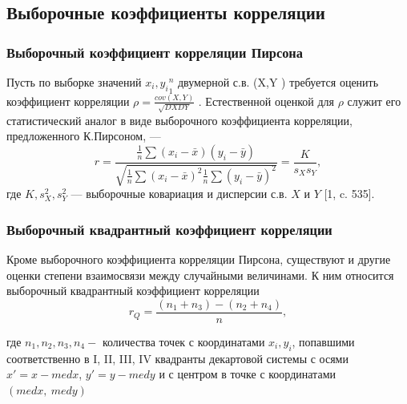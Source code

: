 \documentclass[a4paper,14pt]{article}
\begin{document}
	\subsection{Выборочные коэффициенты корреляции}
	\subsubsection{Выборочный коэффициент корреляции Пирсона}
	\noindent Пусть по выборке значений ${x_{i},y_{i}}^{n}_{1}$ двумерной с.в. (X,Y ) требуется оценить коэффициент корреляции $\rho = \frac{cov(X,Y)}{\sqrt{DXDY}}$ . Естественной оценкой для $\rho$ служит его статистический аналог в виде выборочного коэффициента корреляции, предложенного К.Пирсоном, —
	\begin{equation}
		r = \frac{
			\frac{1}{n}\sum{(x_{i} - \bar{x})(y_{i}-\bar{y})}
		}{
			\sqrt{\frac{1}{n}\sum{(x_{i} - \bar{x})^{2}}\frac{1}{n}\sum{(y_{i} - \bar{y})^{2}}}
		}=\frac{K}{s_{X}s_{Y}},
		\label{r}
	\end{equation}
	где $K,s^{2}_{X},s^{2}_{Y}$ — выборочные ковариация и дисперсии с.в. $X$ и $Y$ [1, c. 535].
	
	
	\subsubsection{Выборочный квадрантный коэффициент корреляции}
	\noindent Кроме выборочного коэффициента корреляции Пирсона, существуют и другие оценки степени взаимосвязи между случайными величинами. К ним относится выборочный квадрантный коэффициент корреляции
	\begin{equation}
		r_{Q} = \frac{(n_{1} + n_{3}) - (n_{2} + n_{4})}{n},
		\label{rQ}
	\end{equation}
	
	\noindent где $n_1, n_2, n_3, n_4 - $ количества точек с координатами $x_i, y_i$, попавшими соответственно в I, II, III, IV квадранты декартовой системы с осями $x'=x-med x$, $y'=y-med y$ и с центром в точке с координатами $(med x,~med y)$
	
	
	
\end{document}
